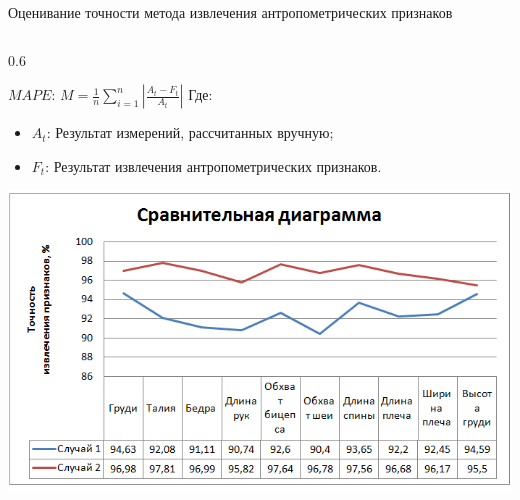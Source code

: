 \documentclass[10pt,pdf,hyperref={unicode},xcolor=table]{beamer}
\begin{document}
\begin{frame}{Оценивание точности метода извлечения антропометрических признаков}		
\begin{columns}
		\begin{column} {0.6\textwidth}			
\begin{block}{}
$MAPE$:
$ M=\frac{1}{n}\sum^n_{i=1}\left|\frac{A_t-F_t}{A_t}\right|$
Где:
\begin{itemize}
	\item $A_t$: Результат измерений, рассчитанных вручную;
	\item $F_t$: Результат извлечения антропометрических признаков.
\end{itemize}
\end{block}

\begin{center}
\includegraphics[width=0.9\linewidth]{p11}
\end{center}


\end{column}
\end{columns}
\end{frame}
\end{document}
